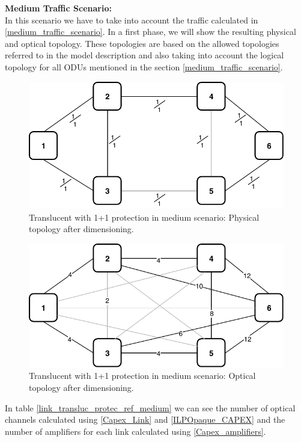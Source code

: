 \textbf{Medium Traffic Scenario:}\\

In this scenario we have to take into account the traffic calculated in \ref{medium_traffic_scenario}. In a first phase, we will show the resulting physical and optical topology. These topologies are based on the allowed topologies referred to in the model description and also taking into account the logical topology for all ODUs mentioned in the section \ref{medium_traffic_scenario}.\\

\begin{figure}[h!]
\centering
\includegraphics[width=12cm]{sdf/ilp/translucent_protection/figures/physical_topology_medium}
\caption{Translucent with 1+1 protection in medium scenario: Physical topology after dimensioning.}
\label{physical3_protectionmedium}
\end{figure}
\newpage
\begin{figure}[h!]
\centering
\includegraphics[width=12cm]{sdf/ilp/translucent_protection/figures/optical_topology_medium}
\caption{Translucent with 1+1 protection in medium scenario: Optical topology after dimensioning.}
\label{optical3_protectionmedium}
\end{figure}

In table \ref{link_transluc_protec_ref_medium} we can see the number of optical channels calculated using \ref{Capex_Link} and \ref{ILPOpaque_CAPEX} and the number of amplifiers for each link calculated using \ref{Capex_amplifiers}.


